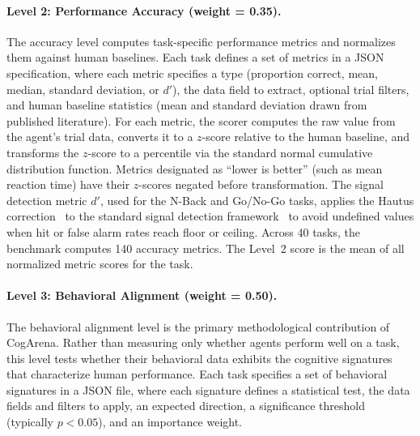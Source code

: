 \documentclass{article}
\begin{document}
\paragraph{Level 2: Performance Accuracy (weight = 0.35).}

The accuracy level computes task-specific performance metrics and normalizes them against human baselines. Each task defines a set of metrics in a JSON specification, where each metric specifies a type (proportion correct, mean, median, standard deviation, or $d'$), the data field to extract, optional trial filters, and human baseline statistics (mean and standard deviation drawn from published literature). For each metric, the scorer computes the raw value from the agent's trial data, converts it to a $z$-score relative to the human baseline, and transforms the $z$-score to a percentile via the standard normal cumulative distribution function. Metrics designated as ``lower is better'' (such as mean reaction time) have their $z$-scores negated before transformation. The signal detection metric $d'$, used for the N-Back and Go/No-Go tasks, applies the Hautus correction~\citep{hautus1995corrections} to the standard signal detection framework~\citep{green1966sdt} to avoid undefined values when hit or false alarm rates reach floor or ceiling. Across 40 tasks, the benchmark computes 140 accuracy metrics. The Level~2 score is the mean of all normalized metric scores for the task.

\paragraph{Level 3: Behavioral Alignment (weight = 0.50).}

The behavioral alignment level is the primary methodological contribution of CogArena. Rather than measuring only whether agents perform well on a task, this level tests whether their behavioral data exhibits the cognitive signatures that characterize human performance. Each task specifies a set of behavioral signatures in a JSON file, where each signature defines a statistical test, the data fields and filters to apply, an expected direction, a significance threshold (typically $p < 0.05$), and an importance weight.
\end{document}
